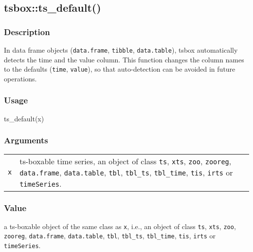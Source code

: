\documentclass[
  letterpaper,
  DIV=11,
  numbers=noendperiod]{scrreport}
\newenvironment{Shaded}{\begin{snugshade}}{\end{snugshade}}
\newcommand{\FunctionTok}[1]{\textcolor[rgb]{0.28,0.35,0.67}{#1}}
\newcommand{\NormalTok}[1]{\textcolor[rgb]{0.00,0.23,0.31}{#1}}
\begin{document}
\subsection{tsbox::ts\_default()}\label{tsboxts_default}

\subsubsection{Description}\label{description-56}

In data frame objects (\texttt{data.frame}, \texttt{tibble},
\texttt{data.table}), tsbox automatically detects the time and the value
column. This function changes the column names to the defaults
(\texttt{time}, \texttt{value}), so that auto-detection can be avoided
in future operations.

\subsubsection{Usage}\label{usage-56}

\begin{Shaded}
\begin{Highlighting}[]
\FunctionTok{ts\_default}\NormalTok{(x)}
\end{Highlighting}
\end{Shaded}

\subsubsection{Arguments}\label{arguments-56}

\begin{longtable}[]{@{}ll@{}}
\toprule\noalign{}
\endhead
\bottomrule\noalign{}
\endlastfoot
\texttt{x} & ts-boxable time series, an object of class \texttt{ts},
\texttt{xts}, \texttt{zoo}, \texttt{zooreg}, \texttt{data.frame},
\texttt{data.table}, \texttt{tbl}, \texttt{tbl\_ts}, \texttt{tbl\_time},
\texttt{tis}, \texttt{irts} or \texttt{timeSeries}. \\
\end{longtable}

\subsubsection{Value}\label{value-56}

a ts-boxable object of the same class as \texttt{x}, i.e., an object of
class \texttt{ts}, \texttt{xts}, \texttt{zoo}, \texttt{zooreg},
\texttt{data.frame}, \texttt{data.table}, \texttt{tbl},
\texttt{tbl\_ts}, \texttt{tbl\_time}, \texttt{tis}, \texttt{irts} or
\texttt{timeSeries}.
\end{document}
